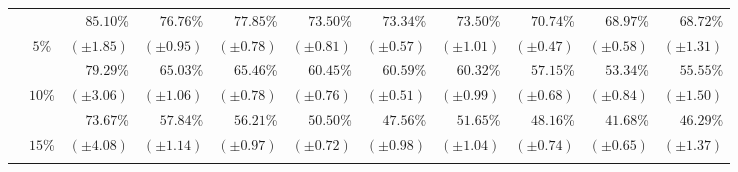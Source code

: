 \begin{table}[!htb]
\begin{center}
{\begin{tabular}{|c|c|r|r|r|r|r|r|r|r|r|}
						\cellcolor{colorTableHeader!15}
							& \cellcolor{colorTableHeader!15}
							& $85.10$\%
							& $76.76$\%
							& $77.85$\%
							& $73.50$\%
							& $73.34$\%
							& $73.50$\%
							& $70.74$\%
							& $68.97$\%
							& $68.72$\%
							\tabularnewline
						\cellcolor{colorTableHeader!15}
							& \multirow{-2}{*}{
								\cellcolor{colorTableHeader!15}
								$5$\%
							}
							& \footnotesize $(\pm1.85)$
							& \footnotesize $(\pm0.95)$
							& \footnotesize $(\pm0.78)$
							& \footnotesize $(\pm0.81)$
							& \footnotesize $(\pm0.57)$
							& \footnotesize $(\pm1.01)$
							& \footnotesize $(\pm0.47)$
							& \footnotesize $(\pm0.58)$
							& \footnotesize $(\pm1.31)$
							\tabularnewline
							\hhline{~----------}
						
						\cellcolor{colorTableHeader!15}
							& \cellcolor{colorTableHeader!15}
							& $79.29$\%
							& $65.03$\%
							& $65.46$\%
							& $60.45$\%
							& $60.59$\%
							& $60.32$\%
							& $57.15$\%
							& $53.34$\%
							& $55.55$\%
							\tabularnewline
						\cellcolor{colorTableHeader!15}
							& \multirow{-2}{*}{
								\cellcolor{colorTableHeader!15}
								$10$\%
							}
							& \footnotesize $(\pm3.06)$
							& \footnotesize $(\pm1.06)$
							& \footnotesize $(\pm0.78)$
							& \footnotesize $(\pm0.76)$
							& \footnotesize $(\pm0.51)$
							& \footnotesize $(\pm0.99)$
							& \footnotesize $(\pm0.68)$
							& \footnotesize $(\pm0.84)$
							& \footnotesize $(\pm1.50)$
							\tabularnewline
							\hhline{~----------}
						
						\cellcolor{colorTableHeader!15}
							& \cellcolor{colorTableHeader!15}
							& $73.67$\%
							& $57.84$\%
							& $56.21$\%
							& $50.50$\%
							& $47.56$\%
							& $51.65$\%
							& $48.16$\%
							& $41.68$\%
							& $46.29$\%
							\tabularnewline
						\cellcolor{colorTableHeader!15}
							& \multirow{-2}{*}{
								\cellcolor{colorTableHeader!15}
								$15$\%
							}
							& \footnotesize $(\pm4.08)$
							& \footnotesize $(\pm1.14)$
							& \footnotesize $(\pm0.97)$
							& \footnotesize $(\pm0.72)$
							& \footnotesize $(\pm0.98)$
							& \footnotesize $(\pm1.04)$
							& \footnotesize $(\pm0.74)$
							& \footnotesize $(\pm0.65)$
							& \footnotesize $(\pm1.37)$
							\tabularnewline
							\hhline{~----------}
						

\end{tabular}}
\end{center}
\end{table}
